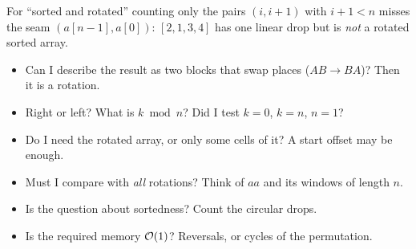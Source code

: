 \begin{warningbox}
For ``sorted and rotated'' counting only the pairs $(i, i+1)$ with $i+1 < n$ misses the seam $(a[n-1], a[0])$: $[2,1,3,4]$ has one linear drop but is \emph{not} a rotated sorted array.
\end{warningbox}

\begin{checklistbox}
\begin{itemize}[leftmargin=*]
    \item[$\square$] Can I describe the result as two blocks that swap places ($AB \to BA$)? Then it is a rotation.
    \item[$\square$] Right or left? What is $k \bmod n$? Did I test $k = 0$, $k = n$, $n = 1$?
    \item[$\square$] Do I need the rotated array, or only some cells of it? A start offset may be enough.
    \item[$\square$] Must I compare with \emph{all} rotations? Think of $aa$ and its windows of length $n$.
    \item[$\square$] Is the question about sortedness? Count the circular drops.
    \item[$\square$] Is the required memory $\mathcal{O}(1)$? Reversals, or cycles of the permutation.
\end{itemize}
\end{checklistbox}

